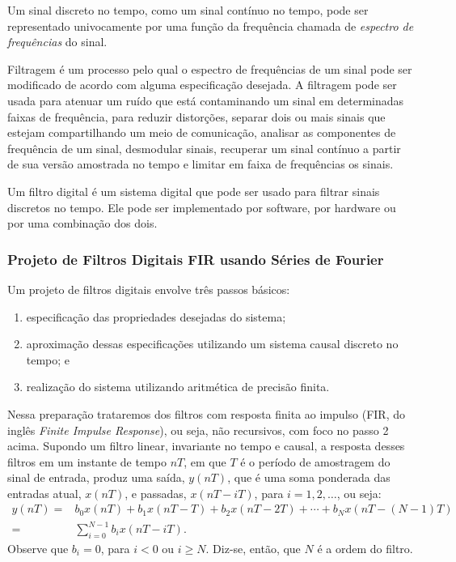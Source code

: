 \documentclass[12pt,addpoints]{exam}
\begin{document}
Um sinal discreto no tempo, como um sinal contínuo no tempo, pode ser representado univocamente por uma função da frequência chamada de \textit{espectro de frequências} do sinal.

Filtragem é um processo pelo qual o espectro de frequências de um sinal pode ser modificado de acordo com alguma especificação desejada. A filtragem pode ser usada para atenuar um ruído que está contaminando um sinal em determinadas faixas de frequência, para reduzir distorções, separar dois ou mais sinais que estejam compartilhando um meio de comunicação, analisar as componentes de frequência de um sinal, desmodular sinais, recuperar um sinal contínuo a partir de sua versão amostrada no tempo e limitar em faixa de frequências os sinais.

Um filtro digital é um sistema digital que pode ser usado para filtrar sinais discretos no tempo. Ele pode ser implementado por software, por hardware ou por uma combinação dos dois.

\subsubsection{Projeto de Filtros Digitais FIR usando Séries de Fourier} \label{sec:fir}

Um projeto de filtros digitais envolve três passos básicos:
\begin{enumerate}
    \item especificação das propriedades desejadas do sistema;
    \item aproximação dessas especificações utilizando um sistema causal
    discreto no tempo; e
    \item realização do sistema utilizando aritmética de precisão finita.
\end{enumerate}
Nessa preparação trataremos dos filtros com resposta finita ao impulso (FIR, do inglês \textit{Finite Impulse Response}), ou seja, não recursivos, com foco no passo 2 acima. Supondo um filtro linear, invariante no tempo e causal, a resposta desses filtros em um instante de tempo $nT$, em que $T$ é o período de amostragem do sinal de entrada, produz uma saída, $y(nT)$, que é uma soma ponderada das entradas atual, $x(nT)$, e passadas, $x(nT - iT)$, para $i = 1, 2, \ldots$, ou seja:
\begin{align} 
    y(nT) =& b_{0}x(nT) + b_{1}x(nT - T) + b_{2}x(nT - 2T) + \cdots + b_{N}x(nT - (N-1)T) \nonumber \\
    =& \sum_{i = 0}^{N-1} b_{i}x(nT - iT). \label{eq:sfiltro}
\end{align}
Observe que $b_{i} = 0$, para $i < 0$ ou $i \ge N$. Diz-se, então, que $N$ é a ordem do filtro. 
\end{document}
